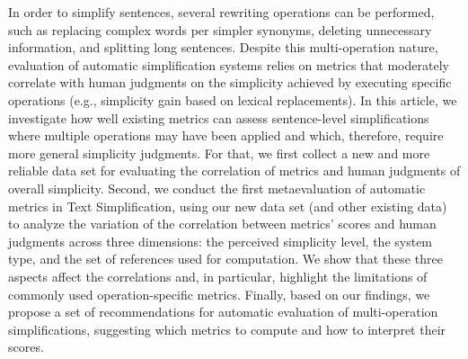 In order to simplify sentences, several rewriting operations can be performed, such as replacing complex words per simpler synonyms, deleting unnecessary information, and splitting long sentences. Despite this multi-operation nature, evaluation of automatic simplification systems relies on metrics that moderately correlate with human judgments on the simplicity achieved by executing specific operations (e.g., simplicity gain based on lexical replacements). In this article, we investigate how well existing metrics can assess sentence-level simplifications where multiple operations may have been applied and which, therefore, require more general simplicity judgments. For that, we first collect a new and more reliable data set for evaluating the correlation of metrics and human judgments of overall simplicity. Second, we conduct the first metaevaluation of automatic metrics in Text Simplification, using our new data set (and other existing data) to analyze the variation of the correlation between metrics' scores and human judgments across three dimensions: the perceived simplicity level, the system type, and the set of references used for computation. We show that these three aspects affect the correlations and, in particular, highlight the limitations of commonly used operation-specific metrics. Finally, based on our findings, we propose a set of recommendations for automatic evaluation of multi-operation simplifications, suggesting which metrics to compute and how to interpret their scores.